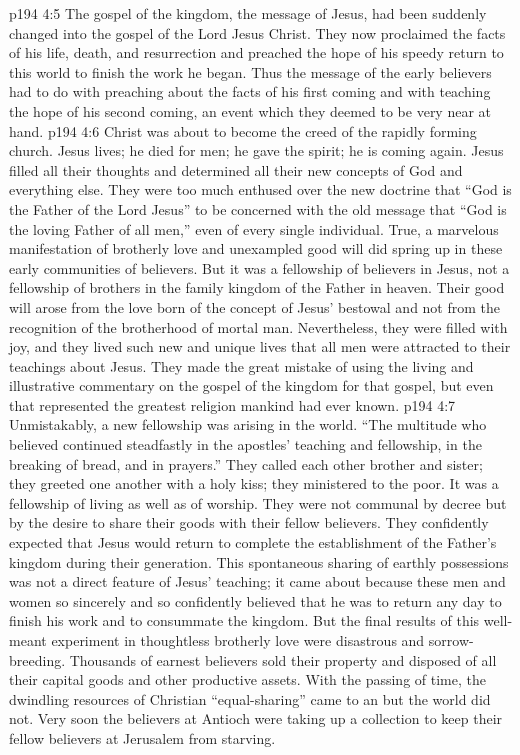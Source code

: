 \vs p194 4:5 The gospel of the kingdom, the message of Jesus, had been suddenly changed into the gospel of the Lord Jesus Christ. They now proclaimed the facts of his life, death, and resurrection and preached the hope of his speedy return to this world to finish the work he began. Thus the message of the early believers had to do with preaching about the facts of his first coming and with teaching the hope of his second coming, an event which they deemed to be very near at hand.
\vs p194 4:6 Christ was about to become the creed of the rapidly forming church. Jesus lives; he died for men; he gave the spirit; he is coming again. Jesus filled all their thoughts and determined all their new concepts of God and everything else. They were too much enthused over the new doctrine that “God is the Father of the Lord Jesus” to be concerned with the old message that “God is the loving Father of all men,” even of every single individual. True, a marvelous manifestation of brotherly love and unexampled good will did spring up in these early communities of believers. But it was a fellowship of believers in Jesus, not a fellowship of brothers in the family kingdom of the Father in heaven. Their good will arose from the love born of the concept of Jesus’ bestowal and not from the recognition of the brotherhood of mortal man. Nevertheless, they were filled with joy, and they lived such new and unique lives that all men were attracted to their teachings about Jesus. They made the great mistake of using the living and illustrative commentary on the gospel of the kingdom for that gospel, but even that represented the greatest religion mankind had ever known.
\vs p194 4:7 Unmistakably, a new fellowship was arising in the world. “The multitude who believed continued steadfastly in the apostles’ teaching and fellowship, in the breaking of bread, and in prayers.” They called each other brother and sister; they greeted one another with a holy kiss; they ministered to the poor. It was a fellowship of living as well as of worship. They were not communal by decree but by the desire to share their goods with their fellow believers. They confidently expected that Jesus would return to complete the establishment of the Father’s kingdom during their generation. This spontaneous sharing of earthly possessions was not a direct feature of Jesus’ teaching; it came about because these men and women so sincerely and so confidently believed that he was to return any day to finish his work and to consummate the kingdom. But the final results of this well\hyp{}meant experiment in thoughtless brotherly love were disastrous and sorrow\hyp{}breeding. Thousands of earnest believers sold their property and disposed of all their capital goods and other productive assets. With the passing of time, the dwindling resources of Christian “equal\hyp{}sharing” came to an but the world did not. Very soon the believers at Antioch were taking up a collection to keep their fellow believers at Jerusalem from starving.
